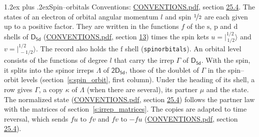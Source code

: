 \documentclass[10pt,a4paper]{article}
\makeatletter
\renewcommand\section{\@startsection{section}{1}{\z@}{-3ex plus -1ex minus -.2ex}%
  {1.2ex plus .2ex}{\normalfont\large\sffamily\bfseries\color{parttitle}}}
\numberwithin{equation}{section}
\newcommand{\grp}[1]{\mathsf{#1}}
\newcommand{\orbital}[1]{\mathrm{#1}}
\newcommand{\mult}{\kappa}
\newcommand{\intx}{\mu}
\newcommand{\jm}[2]{\bigl\lvert{}^{#1}_{\,#2}\bigr\rangle}
\makeatother
\begin{document}
\section{Spin--orbitals}\label{s:spin_orbitals}
Conventions: \href{../../CONVENTIONS.pdf}{CONVENTIONS.pdf}, section \href{../../CONVENTIONS.pdf\#conv.25.4}{25.4}.
\leavevmode\label{n:index.orbital.l}The states of an electron of orbital angular momentum $l$ and spin $\nicefrac{1}{2}$ are each given up to a positive factor. \label{n:local.spinor.uv}\label{n:local.function.f}They are written in the functions $f$ of the $\orbital{s}$, $\orbital{p}$ and $\orbital{d}$ shells of \href{../../../rotation/data/pdf/D5d.pdf}{$\grp{D_{5d}}$} (\href{../../CONVENTIONS.pdf}{CONVENTIONS.pdf}, section \href{../../../rotation/CONVENTIONS.pdf\#conv.13}{13}) times the spin kets $u = \jm{1/2}{1/2}$ and $v = \jm{1/2}{-1/2}$. The record also holds the $\orbital{f}$ shell (\texttt{spinorbitals}). An orbital level consists of the functions of degree $l$ that carry the irrep $\Gamma$ of \href{../../../rotation/data/pdf/D5d.pdf}{$\grp{D_{5d}}$}. With the spin, it splits into the spinor irreps $\Lambda$ of $\grp{2D_{5d}}$, those of the doublet of $\Gamma$ in the spin--orbit levels (section~\ref{s:spin_orbit}, first column). \label{n:head.state}Under the heading of its shell, a row gives $\Gamma$, a copy $\mult$ of $\Lambda$ (when there are several), its partner $\intx$ and the state. The normalized state (\href{../../CONVENTIONS.pdf}{CONVENTIONS.pdf}, section \href{../../CONVENTIONS.pdf\#conv.25.4}{25.4}) follows the partner law with the matrices of section~\ref{s:irrep_matrices}. The copies are adapted to time reversal, which sends $f u$ to $f v$ and $f v$ to $-f u$ (\href{../../CONVENTIONS.pdf}{CONVENTIONS.pdf}, section \href{../../CONVENTIONS.pdf\#conv.25.4}{25.4}).
\end{document}
